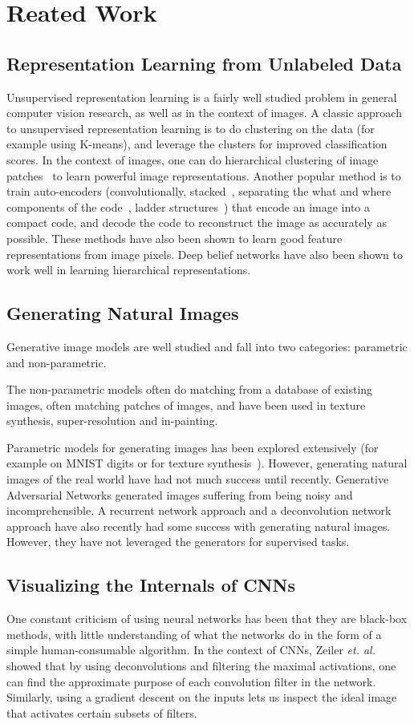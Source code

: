 \documentclass[10pt,twocolumn,letterpaper]{article}
\begin{document}
\section{Reated Work}
\subsection{Representation Learning from Unlabeled Data}
Unsupervised representation learning is a fairly well studied problem in general computer vision research, as well as in the context of images. A classic approach to unsupervised representation learning is to do clustering on the data (for example using K-means), and leverage the clusters for improved classification scores. In the context of images, one can do hierarchical clustering of image patches~\cite{name2} to learn powerful image representations. Another popular method is to train auto-encoders (convolutionally, stacked~\cite{name3}, separating the what and where components of the code~\cite{name4}, ladder structures~\cite{name5}) that encode an image into a compact code, and decode the code to reconstruct the image as accurately
as possible. These methods have also been shown to learn good feature representations from image pixels. Deep belief networks have also been shown to work well in learning hierarchical representations.
\subsection{Generating Natural Images}
Generative image models are well studied and fall into two categories: parametric and non-parametric.
\par The non-parametric models often do matching from a database of existing images, often matching patches of images, and have been used in texture synthesis, super-resolution and in-painting.
\par Parametric models for generating images has been explored extensively (for example on MNIST digits or for texture synthesis~\cite{name6}). However, generating natural images of the real world have had not much success until recently. Generative Adversarial Networks generated
images suffering from being noisy and incomprehensible. A recurrent network
approach  and a deconvolution network approach have also recently had some success with generating natural images. However, they have not leveraged the generators for supervised tasks.
\subsection{Visualizing the Internals of CNNs}
One constant criticism of using neural networks has been that they are black-box methods, with little understanding of what the networks do in the form of a simple human-consumable algorithm. In the
context of CNNs, Zeiler \emph{et. al.}~\cite{name7} showed that by using deconvolutions and filtering the maximal activations, one can find the approximate purpose of each convolution filter in the network. Similarly, using a gradient descent on the inputs lets us inspect the ideal image that
activates certain subsets of filters.
\end{document}

